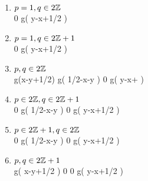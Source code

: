 \begin{enumerate}[(1)]
	\item $p=1,q\in2\mathbb{Z}$\\
\hspace*{0cm}\commonShift\mytableThreeTwo	%
{}		{}
{\yipx}			{0}
{\yimx}			{g\kern-0.05cm\left( {y-x+{1}/{2}} \right)}
	\item $p=1,q\in2\mathbb{Z}+1$\\
\hspace*{0cm}\commonShift\mytableThreeTwo	%
{}		{}
{\yipx}			{0}
{\yimx}			{g\kern-0.05cm\left( {y-x+{1}/{2}} \right)}
	\item $p,q\in2\mathbb{Z}$\\
\hspace*{-0cm}\commonShift\mytable	%
{}	{\yipy}					{\yimy}
{\yipx}	{g\kern-0.05cm\left({x-y+1/2}\right)} 	{g\kern-0.05cm\left( {1/2-x-y} \right)}
{\yipx}	{0} 					{g\kern-0.05cm\left( {y-x}+ \right)}
\item $p\in2\mathbb{Z},q\in2\mathbb{Z}+1$\\
\commonShift\mytable	%
{}	{\yipy}	{\yimy}
{\yipx} {0}	{g\kern-0.05cm\left( {1/2-x-y} \right)}
{\yimx} {0} 	{g\kern-0.05cm\left( {y-x+1/2} \right)}
\item $p\in2\mathbb{Z}+1,q\in2\mathbb{Z}$\\
\commonShift\mytable	%
{}		{\yipy}		{\yimy}
{\yipx}		{0} 		{g\kern-0.05cm\left( {1/2-x-y} \right)}	
{\yimx} 	{0} 		{g\kern-0.05cm\left( {y-x+1/2} \right)}
\item $p,q\in2\mathbb{Z}+1$\\
\commonShift\mytable	%
{}		{\yipy}							{\yimy}
{{\yipx}}	{g\kern-0.05cm\left( {x-y+1/2} \right)}			{0}
{{\yimx}}	{0}							{g\kern-0.05cm\left( {y-x+1/2} \right)}	
\end{enumerate}
